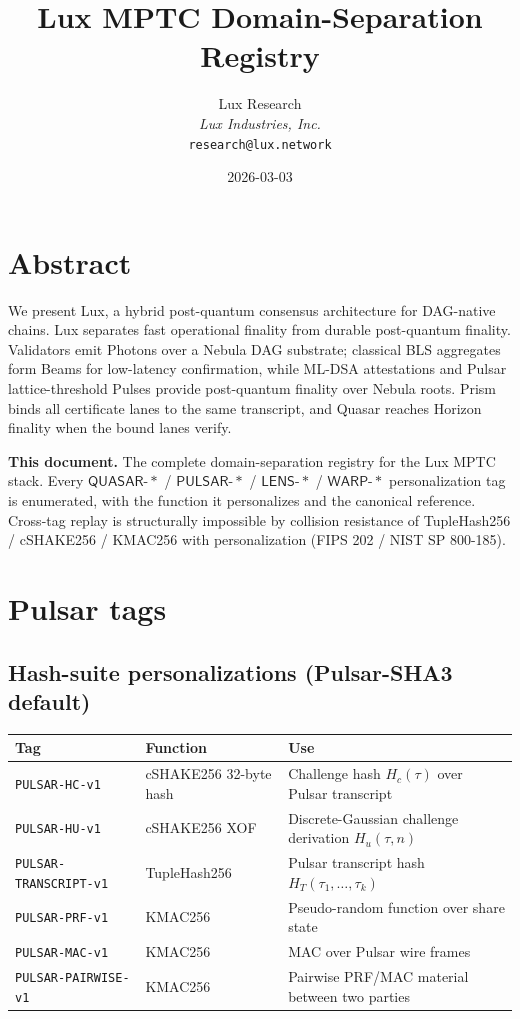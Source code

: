 \documentclass[11pt,a4paper]{article}
\title{Lux MPTC Domain-Separation Registry}
\author{
Lux Research\\
\textit{Lux Industries, Inc.}\\
\texttt{research@lux.network}
}
\date{2026-03-03}
\begin{document}
\luxcoverpage

\section*{Abstract}

\noindent We present Lux, a hybrid post-quantum consensus architecture for DAG-native chains. Lux separates fast operational finality from durable post-quantum finality. Validators emit Photons over a Nebula DAG substrate; classical BLS aggregates form Beams for low-latency confirmation, while ML-DSA attestations and Pulsar lattice-threshold Pulses provide post-quantum finality over Nebula roots. Prism binds all certificate lanes to the same transcript, and Quasar reaches Horizon finality when the bound lanes verify.

\textbf{This document.} The complete domain-separation registry for the Lux MPTC stack. Every $\mathsf{QUASAR\text{-}*}$ / $\mathsf{PULSAR\text{-}*}$ / $\mathsf{LENS\text{-}*}$ / $\mathsf{WARP\text{-}*}$ personalization tag is enumerated, with the function it personalizes and the canonical reference. Cross-tag replay is structurally impossible by collision resistance of TupleHash256 / cSHAKE256 / KMAC256 with personalization (FIPS 202 / NIST SP 800-185).

\section{Pulsar tags}

\subsection{Hash-suite personalizations (Pulsar-SHA3 default)}

\begin{tabularx}{\textwidth}{@{}p{}p{}X@{}}
  \toprule
  \textbf{Tag} & \textbf{Function} & \textbf{Use} \\
  \midrule
  \texttt{PULSAR-HC-v1}        & cSHAKE256 32-byte hash & Challenge hash $H_c(\tau)$ over Pulsar transcript \\
  \texttt{PULSAR-HU-v1}        & cSHAKE256 XOF & Discrete-Gaussian challenge derivation $H_u(\tau, n)$ \\
  \texttt{PULSAR-TRANSCRIPT-v1} & TupleHash256 & Pulsar transcript hash $H_T(\tau_1, \ldots, \tau_k)$ \\
  \texttt{PULSAR-PRF-v1}       & KMAC256 & Pseudo-random function over share state \\
  \texttt{PULSAR-MAC-v1}       & KMAC256 & MAC over Pulsar wire frames \\
  \texttt{PULSAR-PAIRWISE-v1}  & KMAC256 & Pairwise PRF/MAC material between two parties \\
  \bottomrule
\end{tabularx}
\end{document}
